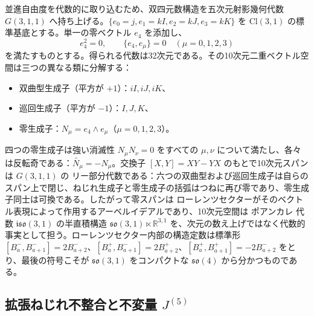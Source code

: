 \documentclass[a4paper]{article}
\theoremstyle{definition}
\theoremstyle{remark}
\begin{document}
並進自由度を代数的に取り込むため、双四元数構造を五次元射影幾何代数 \( G(3,1,1) \) へ持ち上げる。\(\{e_0 = j, e_1 = kI, e_2 = kJ, e_3 = kK\}\) を \(\mathrm{Cl}(3,1)\) の標準基底とする。単一の零ベクトル \( e_4 \) を添加し、
\[
e_4^2 = 0, \qquad \{e_4, e_\mu\} = 0 \quad (\mu = 0,1,2,3)
\]
を満たすものとする。得られる代数は32次元である。その10次元二重ベクトル空間は三つの異なる類に分解する：
\begin{itemize}
  \item 双曲型生成子（平方が \( +1 \)）：\( iI, iJ, iK \)、
  \item 巡回生成子（平方が \( -1 \)）：\( I, J, K \)、
  \item 零生成子：\( N_\mu = e_4 \wedge e_\mu \)（\( \mu = 0,1,2,3 \)）。
\end{itemize}
四つの零生成子は強い消滅性 \( N_\mu N_\nu = 0 \) をすべての \(\mu,\nu\) について満たし、各々は反転奇である：\( \widetilde{N_\mu} = -N_\mu \)。交換子 \([X,Y]=XY-YX\) のもとで10次元スパンは \( G(3,1,1) \) の リー部分代数である：六つの双曲型および巡回生成子は自らのスパン上で閉じ、ねじれ生成子と零生成子の括弧はつねに再び零であり、零生成子同士は可換である。したがって零スパンは ローレンツセクターがそのベクトル表現によって作用するアーベルイデアルであり、10次元空間は ポアンカレ 代数 \(\mathfrak{iso}(3,1)\) の半直積構造 \(\mathfrak{so}(3,1)\ltimes\mathbb{R}^{3,1}\) を、次元の数え上げではなく代数的事実として担う。ローレンツセクター内部の構造定数は標準形 \([B^-_a,B^-_{a+1}]=2B^-_{a+2}\)、\([B^+_a,B^-_{a+1}]=2B^+_{a+2}\)、\([B^+_a,B^+_{a+1}]=-2B^-_{a+2}\) をとり、最後の符号こそが \(\mathfrak{so}(3,1)\) をコンパクトな \(\mathfrak{so}(4)\) から分かつものである。

\subsection{拡張ねじれ不整合と不変量 \texorpdfstring{\( J^{(5)} \)}{J}}
\end{document}

